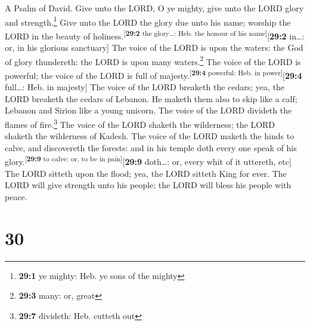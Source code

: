 A Psalm of David.  Give unto the LORD, O ye mighty, give
unto the LORD glory and strength.\footnote{\textbf{29:1} ye mighty: Heb.
  ye sons of the mighty}  Give unto the LORD the glory due
unto his name; worship the LORD in the beauty of
holiness.\textsuperscript{{[}\textbf{29:2} the glory\ldots: Heb. the
honour of his name{]}}{[}\textbf{29:2} in\ldots: or, in his glorious
sanctuary{]}  The voice of the LORD is upon the waters:
the God of glory thundereth: the LORD is upon many waters.\footnote{\textbf{29:3}
  many: or, great}  The voice of the LORD is powerful; the
voice of the LORD is full of majesty.\textsuperscript{{[}\textbf{29:4}
powerful: Heb. in power{]}}{[}\textbf{29:4} full\ldots: Heb. in
majesty{]}  The voice of the LORD breaketh the cedars;
yea, the LORD breaketh the cedars of Lebanon.  He maketh
them also to skip like a calf; Lebanon and Sirion like a young unicorn.
 The voice of the LORD divideth the flames of
fire.\footnote{\textbf{29:7} divideth: Heb. cutteth out} 
The voice of the LORD shaketh the wilderness; the LORD shaketh the
wilderness of Kadesh.  The voice of the LORD maketh the
hinds to calve, and discovereth the forests: and in his temple doth
every one speak of his glory.\textsuperscript{{[}\textbf{29:9} to calve:
or, to be in pain{]}}{[}\textbf{29:9} doth\ldots: or, every whit of it
uttereth, etc{]}  The LORD sitteth upon the flood; yea,
the LORD sitteth King for ever.  The LORD will give
strength unto his people; the LORD will bless his people with peace.

\hypertarget{section-29}{%
\section{30}\label{section-29}}

